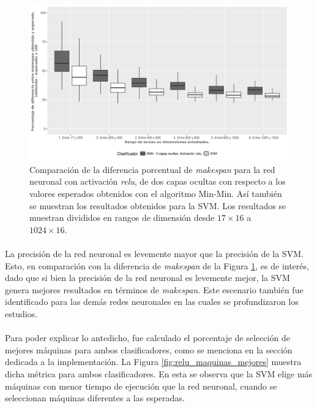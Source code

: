 \begin{figure}[H]
  \centering
  \includegraphics[width=\columnwidth]{imagenes/relu/2_medianas_diferenciasann_2_capas_ocultas_relu.png}
  \caption{Comparación de la diferencia porcentual de \textit{makespan} para la red neuronal con activación \textit{relu}, de dos capas ocultas con respecto a los valores esperados obtenidos con el algoritmo Min-Min.
Así también se muestran los resultados obtenidos para la SVM.
Los resultados se muestran divididos en rangos de dimensión desde $ 17 \times 16$ a $ 1024 \times 16$.}
  \label{fig:relu_makespan}
\end{figure}

\paragraph{}La precisión de la red neuronal es levemente mayor que la precisión de la SVM.
Esto, en comparación con la diferencia de \textit{makespan} de la Figura \ref{fig:relu_makespan}, es de interés, dado que si bien la precisión de la red neuronal es levemente mejor, la SVM genera mejores resultados en términos de \textit{makespan}.
Este escenario también fue identificado para las demás redes neuronales en las cuales se profundizaron los estudios. 

\paragraph{} Para poder explicar lo antedicho, fue calculado el porcentaje de selección de mejores máquinas para ambos clasificadores, como se menciona en la sección dedicada a la implementación.
La Figura \ref{fig:relu_maquinas_mejores} muestra dicha métrica para ambos clasificadores.
En esta se observa que la SVM elige más máquinas con menor tiempo de ejecución que la red neuronal, cuando  se seleccionan máquinas diferentes a las esperadas. 

